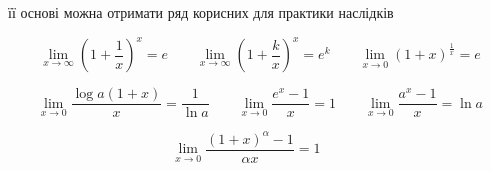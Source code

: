  її основі можна отримати ряд корисних для практики наслідків

\begin{displaymath}
    \lim_{x \to \infty} (1+\frac{1}{x})^{x} = e \qquad
    \lim_{x \to \infty} (1+\frac{k}{x})^{x} = e^k \qquad
    \lim_{x \to 0} (1+x)^{\frac{1}{x}} = e
\end{displaymath}


\begin{displaymath}
    \lim_{x \to 0} \frac{\log{a}(1+x)}{x} = \frac{1}{\ln{a}} \qquad
    \lim_{x \to 0} \frac{e^x-1}{x} = 1 \qquad
    \lim_{x \to 0} \frac{a^x-1}{x} = \ln{a}
\end{displaymath}


\begin{displaymath}
    \lim_{x \to 0} \frac{({1+x})^\alpha-1}{\alpha{x}}=1 \qquad
\end{displaymath}
 
